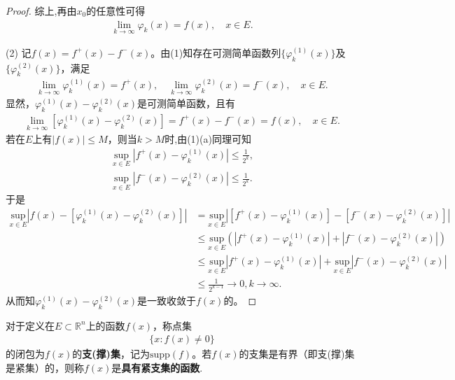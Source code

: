\documentclass[../../main.tex]{subfiles}%
\begin{document}
\begin{proof}
综上,再由$x_0$的任意性可得
\begin{align*}
\lim_{k \to \infty} \varphi_k(x) = f(x), \quad x \in E.
\end{align*}

(2) 记$f(x) = f^+(x) - f^-(x)$。由(1)知存在可测简单函数列$\{\varphi_k^{(1)}(x)\}$及$\{\varphi_k^{(2)}(x)\}$，满足
\begin{align*}
\lim_{k \to \infty} \varphi_k^{(1)}(x) = f^+(x), \quad \lim_{k \to \infty} \varphi_k^{(2)}(x) = f^-(x), \quad x \in E.
\end{align*}
显然，$\varphi_k^{(1)}(x) - \varphi_k^{(2)}(x)$是可测简单函数，且有
\begin{align*}
\lim_{k \to \infty} [\varphi_k^{(1)}(x) - \varphi_k^{(2)}(x)] = f^+(x) - f^-(x) = f(x), \quad x \in E.
\end{align*}
若在$E$上有$|f(x)| \leqslant M$，则当$k > M$时,由(1)(a)同理可知
\begin{align*}
\sup_{x\in E} |f^+(x) - \varphi_k^{(1)}(x)| \leqslant \frac{1}{2^k},\\
\sup_{x\in E} |f^-(x) - \varphi_k^{(2)}(x)| \leqslant \frac{1}{2^k}.
\end{align*}
于是
\begin{align*}
\underset{x\in E}{\mathrm{sup}}\left| f\left( x \right) -\left[ \varphi _{k}^{(1)}(x)-\varphi _{k}^{(2)}(x) \right] \right|&=\underset{x\in E}{\mathrm{sup}}\left| \left[ f^+\left( x \right) -\varphi _{k}^{\left( 1 \right)}\left( x \right) \right] -\left[ f^-\left( x \right) -\varphi _{k}^{\left( 2 \right)}\left( x \right) \right] \right|
\\
&\leqslant \underset{x\in E}{\mathrm{sup}}\left( \left| f^+\left( x \right) -\varphi _{k}^{\left( 1 \right)}\left( x \right) \right|+\left| f^-\left( x \right) -\varphi _{k}^{\left( 2 \right)}\left( x \right) \right| \right) 
\\
&\leqslant \underset{x\in E}{\mathrm{sup}}\left| f^+\left( x \right) -\varphi _{k}^{\left( 1 \right)}\left( x \right) \right|+\underset{x\in E}{\mathrm{sup}}\left| f^-\left( x \right) -\varphi _{k}^{\left( 2 \right)}\left( x \right) \right|
\\
&\leqslant \frac{1}{2^{k-1}}\rightarrow 0,k\rightarrow \infty .
\end{align*}
从而知$\varphi_k^{(1)}(x) - \varphi_k^{(2)}(x)$是一致收敛于$f(x)$的。 

\end{proof}

\begin{definition}
对于定义在$E \subset \mathbb{R}^n$上的函数$f(x)$，称点集
\begin{align*}
\{x: f(x) \neq 0\}
\end{align*}
的闭包为$f(x)$的\textbf{支(撑)集}，记为$\mathrm{supp}(f)$。若$f(x)$的支集是有界（即支(撑)集是紧集）的，则称$f(x)$是\textbf{具有紧支集的函数}. 
\end{definition}
\end{document}
